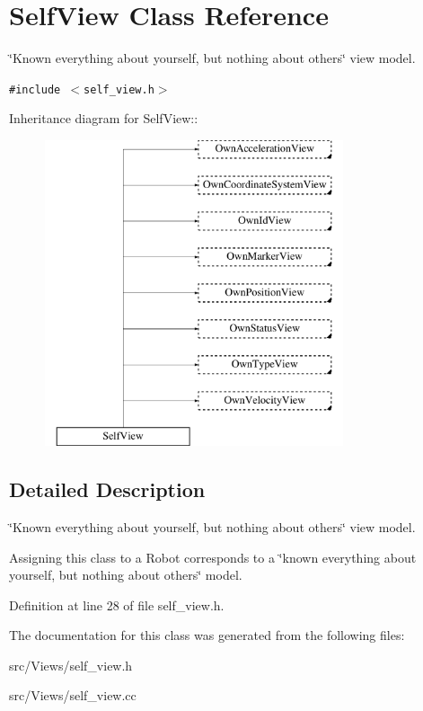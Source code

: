 \hypertarget{class_self_view}{
\section{SelfView Class Reference}
\label{class_self_view}
}
\char`\"{}Known everything about yourself, but nothing about others\char`\"{} view model.  


{\tt \#include $<$self\_\-view.h$>$}

Inheritance diagram for SelfView::\begin{figure}[H]
\begin{center}
\leavevmode
\includegraphics[height=9cm]{class_self_view}
\end{center}
\end{figure}


\subsection{Detailed Description}
\char`\"{}Known everything about yourself, but nothing about others\char`\"{} view model. 

Assigning this class to a Robot corresponds to a \char`\"{}known everything about yourself, but nothing about others\char`\"{} model. 

Definition at line 28 of file self\_\-view.h.

The documentation for this class was generated from the following files:\begin{CompactItemize}
\item 
src/Views/self\_\-view.h\item 
src/Views/self\_\-view.cc\end{CompactItemize}
